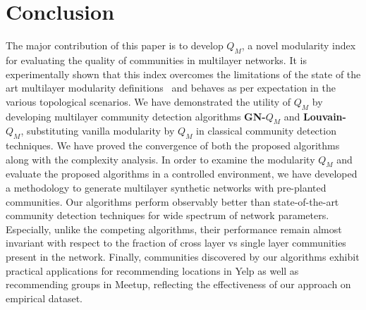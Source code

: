 \section{Conclusion}
\label{conclus}
The major contribution of this paper is to develop $Q_M$, a novel modularity index for evaluating the quality of communities in 
multilayer networks.
It is experimentally shown that this index overcomes the limitations of the state of the art multilayer modularity
definitions~\cite{CompMod,medical_paper} and behaves as per expectation in the various topological scenarios.
We have demonstrated the utility of $Q_M$ by developing multilayer community detection 
algorithms \textbf{GN-$Q_M$} and \textbf{Louvain-$Q_M$}, substituting vanilla modularity by $Q_M$ in classical community detection 
techniques. We have proved the convergence of both the proposed algorithms along with the complexity analysis.
In order to examine the modularity $Q_M$ and evaluate the proposed algorithms in a controlled environment, we have developed a 
methodology to generate multilayer synthetic networks with pre-planted communities.
Our algorithms perform observably better than state-of-the-art community detection techniques for wide
spectrum of network parameters. Especially, unlike the competing algorithms, their performance remain almost invariant with
respect to the fraction of cross layer vs single layer communities present in the network. Finally, communities discovered 
by our algorithms exhibit practical applications for recommending locations in Yelp as well as recommending groups in Meetup, reflecting 
the effectiveness of our approach on
empirical dataset.
